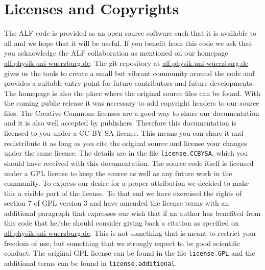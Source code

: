 

\section{Licenses and Copyrights}

The  ALF code  is provided as an open source software  such that it is  available  to all and we  hope that  it 
will be useful.  If you benefit from this code  we ask that you acknowledge  the ALF collaboration  as mentioned on our
homepage \url{alf.physik.uni-wuerzburg.de}.   The git repository at   \url{alf.physik.uni-wuerzburg.de} gives us the tools to 
create a small but vibrant community around the code and provides a suitable entry point for future contributors  and future developments. 
The homepage is also the place where the original source files can be found.
With the coming public release it was necessary to add copyright headers to our source files.
The Creative Commons licenses are a good way to share our documentation and it is also well accepted by publishers. Therefore this documentation is licensed to you under a CC-BY-SA license.
This means you can share it and redistribute it as long as you cite the original source and license your changes under the same license. The details are in the file \texttt{license.CCBYSA}, which you should have received with this documentation.
The source code itself is licensed under a GPL license to keep the source as well as any future work in the community.
To express our desire for a proper attribution we decided to make this a visible part of the license.
To that end we have exercised the rights of section 7 of GPL version 3 and have amended the license terms with an additional paragraph that expresses our wish that if an author has benefited from this code
that he/she should consider giving back a citation as specified on \url{alf.physik.uni-wuerzburg.de}.
This is not something that is meant to restrict your freedom of use, but something that we strongly expect to be good scientific conduct.
The original GPL license can be found in the file \texttt{license.GPL} and the additional terms can be found in \texttt{license.additional}.
